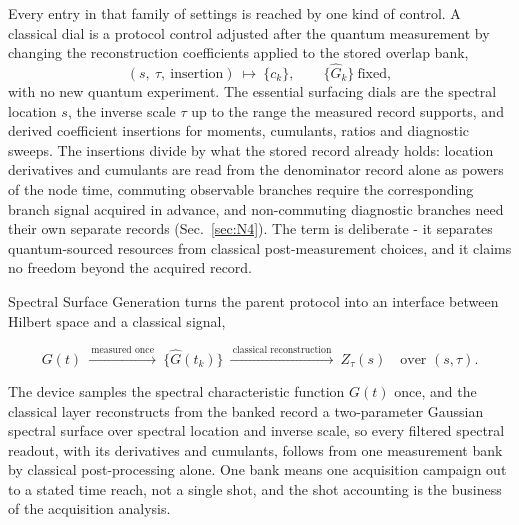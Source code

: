 Every entry in that family of settings is reached by one kind of control. A classical dial is a protocol control adjusted after the quantum measurement by changing the reconstruction coefficients applied to the stored overlap bank,
\begin{equation}\label{def:classical-dial}
(s,\ \tau,\ \text{insertion})\ \longmapsto\ \{c_k\},\qquad \{\widehat G_k\}\ \text{fixed},
\end{equation}
with no new quantum experiment. The essential surfacing dials are the spectral location $s$, the inverse scale $\tau$ up to the range the measured record supports, and derived coefficient insertions for moments, cumulants, ratios and diagnostic sweeps. The insertions divide by what the stored record already holds: location derivatives and cumulants are read from the denominator record alone as powers of the node time, commuting observable branches require the corresponding branch signal acquired in advance, and non-commuting diagnostic branches need their own separate records (Sec.~\ref{sec:N4}). The term is deliberate - it separates quantum-sourced resources from classical post-measurement choices, and it claims no freedom beyond the acquired record.

Spectral Surface Generation turns the parent protocol \cite{mccaul2025snacks} into an interface between Hilbert space and a classical signal,
\begin{widetext}
\begin{equation}\label{def:spectral-surfacing}
G(t)\ \xrightarrow{\ \text{measured once}\ }\ \bigl\{\widehat G(t_k)\bigr\}\ \xrightarrow{\ \text{classical reconstruction}\ }\ Z_\tau(s)\quad \text{over } (s,\tau).
\end{equation}
\end{widetext}
The device samples the spectral characteristic function $G(t)$ once, and the classical layer reconstructs from the banked record a two-parameter Gaussian spectral surface over spectral location and inverse scale, so every filtered spectral readout, with its derivatives and cumulants, follows from one measurement bank by classical post-processing alone. One bank means one acquisition campaign out to a stated time reach, not a single shot, and the shot accounting is the business of the acquisition analysis.

